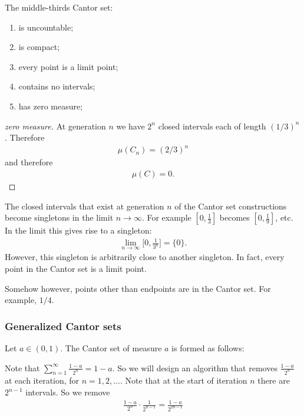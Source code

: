 \begin{theorem*}
  The middle-thirds Cantor set:
  \begin{enumerate}
  \item is uncountable;
  \item is compact;
  \item every point is a limit point;
  \item contains no intervals;
  \item has zero measure;
  \end{enumerate}
\end{theorem*}
\begin{proof}[zero measure]
At generation $n$ we have $2^n$ closed intervals each of length $(1/3)^n$. Therefore
\begin{align*}
  \mu(C_n) = (2/3)^n
\end{align*}
and therefore
\begin{align*}
  \mu(C) = 0.
\end{align*}
\end{proof}

\begin{intuition*}
  The closed intervals that exist at generation $n$ of the Cantor set constructions become singletons in the
  limit $n \to \infty$. For example $[0,\frac{1}{3}]$ becomes $[0,\frac{1}{9}]$, etc. In the limit this gives
  rise to a singleton:
  \begin{align*}
    \lim_{n\to\infty} \Big[0, \frac{1}{3^n}\Big] = \{0\}.
  \end{align*}
  However, this singleton is arbitrarily close to another singleton. In fact, every point in the Cantor set is
  a limit point.

  Somehow however, points other than endpoints are in the Cantor set. For example, $1/4$.
\end{intuition*}

\subsubsection{Generalized Cantor sets}
    Let $a \in (0, 1)$. The Cantor set of measure $a$ is formed as follows:

    Note that $\sum_{n=1}^\infty \frac{1 - a}{2^n} = 1 - a$. So we will design an algorithm that
    removes $\frac{1-a}{2^n}$ at each iteration, for $n=1, 2, \ldots$. Note that at the start of iteration $n$
    there are $2^{n-1}$ intervals. So we remove
    \begin{align*}
      \frac{1-a}{2^{n}}\cdot\frac{1}{2^{n-1}} = \frac{1 - a}{2^{2n - 1}}
    \end{align*}

